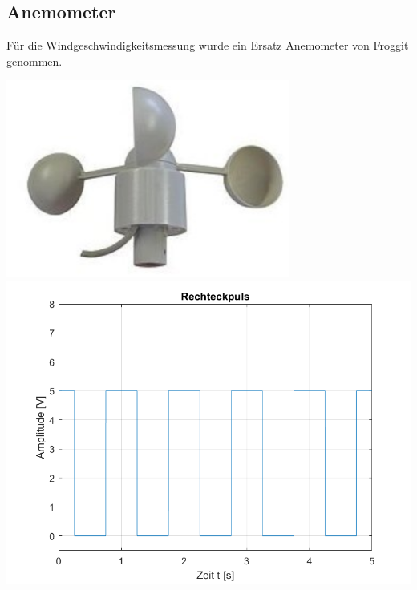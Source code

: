 \subsection{Anemometer}
\begin{minipage}{0.5\textwidth}
Für die Windgeschwindigkeitsmessung wurde ein Ersatz Anemometer von Froggit genommen.
\end{minipage}
\begin{minipage}{0.49\textwidth}
\centering
\includegraphics[width=0.7\textwidth]{graphics/Anemometer/anemometer.png}
\label{fig:anemometer}
\includegraphics[width = \textwidth]{graphics/Anemometer/rechteckpuls.png}
\label{fig:rechteckpuls}
\end{minipage}

